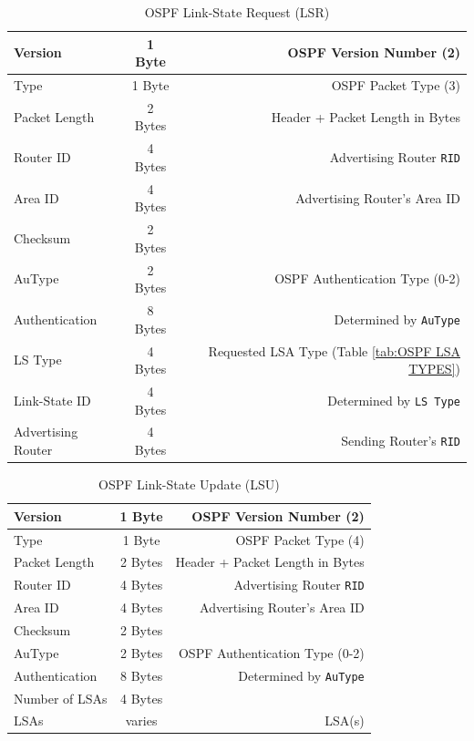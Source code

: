 \documentclass[12pt]{article}
\begin{document}
	\begin{table}[H]
	\centering
	\caption{OSPF Link-State Request (LSR) \label{tab:OSPF LSR}}
	\begin{tabular}{| l | c | r |}
	\hline
	Version			& 1 Byte	& OSPF Version Number (2)\\\hline
	Type				& 1 Byte	& OSPF Packet Type (3)\\\hline
	Packet Length		& 2 Bytes	& Header + Packet Length in Bytes\\\hline
	Router ID			& 4 Bytes	& Advertising Router \texttt{RID}\\\hline
	Area ID			& 4 Bytes	& Advertising Router's Area ID\\\hline
	Checksum			& 2 Bytes	&\\\hline
	AuType			& 2 Bytes	& OSPF Authentication Type (0-2)\\\hline
	Authentication		& 8 Bytes	& Determined by \texttt{AuType}\\\hline
	LS Type			& 4 Bytes	& Requested LSA Type (Table \ref{tab:OSPF LSA TYPES})\\\hline
	Link-State ID		& 4 Bytes	& Determined by \texttt{LS Type}\\\hline
	Advertising Router	& 4 Bytes	& Sending Router's \texttt{RID}\\\hline
	\end{tabular}\end{table}

	\begin{table}[H]
	\centering
	\caption{OSPF Link-State Update (LSU) \label{tab:OSPF LSU}}
	\begin{tabular}{| l | c | r |}
	\hline
	Version		& 1 Byte	& OSPF Version Number (2)\\\hline
	Type			& 1 Byte	& OSPF Packet Type (4)\\\hline
	Packet Length	& 2 Bytes	& Header + Packet Length in Bytes\\\hline
	Router ID		& 4 Bytes	& Advertising Router \texttt{RID}\\\hline
	Area ID		& 4 Bytes	& Advertising Router's Area ID\\\hline
	Checksum		& 2 Bytes	&\\\hline
	AuType		& 2 Bytes	& OSPF Authentication Type (0-2)\\\hline
	Authentication	& 8 Bytes	& Determined by \texttt{AuType}\\\hline
	Number of LSAs	& 4 Bytes	&\\\hline
	LSAs			& varies	& LSA(s)\\\hline
	\end{tabular}\end{table}
\end{document}
